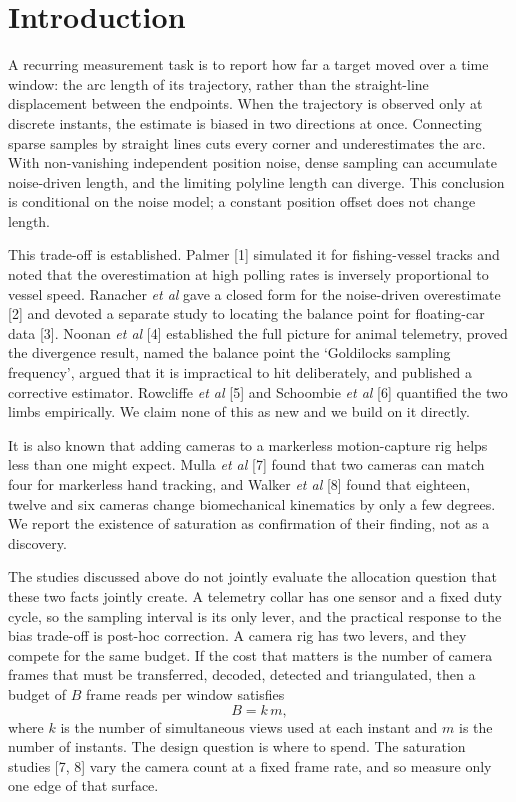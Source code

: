 \documentclass{iopjournal}
\begin{document}
\section{Introduction}
\label{sec:introduction}

A recurring measurement task is to report how far a target moved over a time
window: the arc length of its trajectory, rather than the straight-line
displacement between the endpoints. When the trajectory is observed only at
discrete instants, the estimate is biased in two directions at once.
Connecting sparse samples by straight lines cuts every corner and
underestimates the arc. With non-vanishing independent position noise, dense sampling can accumulate
noise-driven length, and the limiting polyline length can diverge. This
conclusion is conditional on the noise model; a constant position offset
does not change length.

This trade-off is established. Palmer [1] simulated it for fishing-vessel
tracks and noted that the overestimation at high polling rates is inversely
proportional to vessel speed. Ranacher \textit{et al} gave a closed form for
the noise-driven overestimate [2] and devoted a separate study to locating the
balance point for floating-car data [3]. Noonan \textit{et al} [4] established
the full picture for animal telemetry, proved the divergence result, named the
balance point the `Goldilocks sampling frequency', argued that it is
impractical to hit deliberately, and published a corrective estimator.
Rowcliffe \textit{et al} [5] and Schoombie \textit{et al} [6] quantified the
two limbs empirically. We claim none of this as new and we build on it
directly.

It is also known that adding cameras to a markerless motion-capture rig helps
less than one might expect. Mulla \textit{et al} [7] found that two cameras
can match four for markerless hand tracking, and Walker \textit{et al} [8]
found that eighteen, twelve and six cameras change biomechanical kinematics by
only a few degrees. We report the existence of saturation as confirmation of
their finding, not as a discovery.

The studies discussed above do not jointly evaluate the allocation question that these two
facts jointly create. A telemetry collar has one sensor and a fixed duty
cycle, so the sampling interval is its only lever, and the practical response
to the bias trade-off is post-hoc correction. A camera rig has two levers, and
they compete for the same budget. If the cost that matters is the number of
camera frames that must be transferred, decoded, detected and triangulated,
then a budget of $B$ frame reads per window satisfies
\begin{equation}
B = k\,m,
\label{eq:budget}
\end{equation}
where $k$ is the number of simultaneous views used at each instant and $m$ is
the number of instants. The design question is where to spend. The saturation
studies [7, 8] vary the camera count at a fixed frame rate, and so measure
only one edge of that surface.
\end{document}
